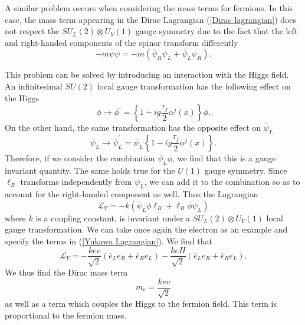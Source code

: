 \documentclass[10pt,a4paper]{book}
\begin{document}
A similar problem occurs when considering the mass terms for fermions. In this case, the mass term appearing in the Dirac Lagrangian (\ref{Dirac lagrangian}) does not respect the $SU_L(2)\otimes U_Y(1)$ gauge symmetry due to the fact that the left and right-handed components of the spinor transform differently
\begin{equation}
-m\overline{\psi}\psi = -m\left(\overline{\psi}_R\psi_L + \overline{\psi}_L\psi_R\right).
\end{equation}

This problem can be solved by introducing an interaction with the Higgs field. An infinitesimal $SU(2)$ local gauge transformation has the following effect on the Higgs
\begin{equation}
\phi \rightarrow \phi^\prime = \left\lbrace 1 + ig\frac{\tau_j}{2}\alpha^j(x)\right\rbrace\phi.
\end{equation} 
On the other hand, the same transformation has the opposite effect on $\overline{\psi}_L$
\begin{equation}
\overline{\psi}_L \rightarrow \overline{\psi}^\prime_L = \overline{\psi}_L\left\lbrace 1 - ig\frac{\tau_j}{2}\alpha^j(x) \right\rbrace.
\end{equation}
Therefore, if we consider the combination $\overline{\psi}_L\phi$, we find that this is a gauge invariant quantity. The same holds true for the $U(1)$ gauge symmetry.
Since $\ell_R$ transforms independently from $\psi_L$, we can add it to the combination so as to account for the right-handed component as well. Thus the Lagrangian
\begin{equation}
\label{Yukawa Lagrangian}
\mathcal{L}_Y = -k\left(\overline{\psi}_L\phi\ell_R + \overline{\ell}_R\overline{\phi}\psi_L\right)
\end{equation}
where $k$ is a coupling constant, is invariant under a $SU_L(2)\otimes U_Y(1)$ local gauge transformation.
We can take once again the electron as an example and specify the terms in (\ref{Yukawa Lagrangian}). We find that
\begin{equation}
\mathcal{L}_Y = -\frac{kev}{\sqrt{2}}\left(\overline{e}_L e_R +\overline{e}_R e_L\right) - \frac{keH}{\sqrt{2}}\left(\overline{e}_L e_R +\overline{e}_R e_L\right).
\end{equation}
We thus find the Dirac mass term
\begin{equation}
m_e = \frac{kev}{\sqrt{2}}
\end{equation}
as well as a term which couples the Higgs to the fermion field. This term is proportional to the fermion mass. 
\end{document}
